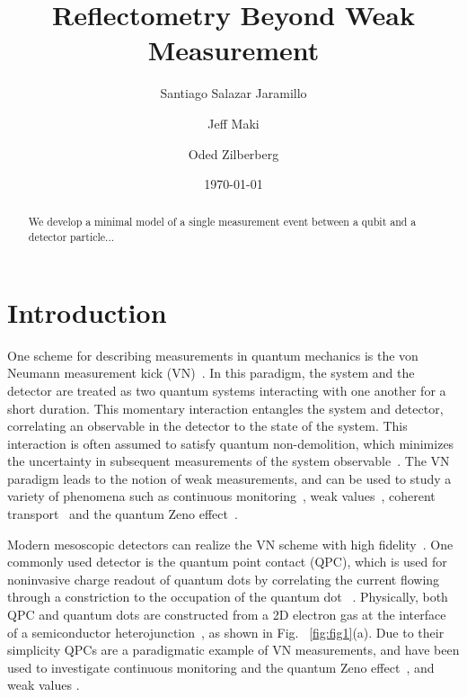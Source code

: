 \documentclass[10pt,
 amsmath,amssymb,
 aps,prb, twocolumn
]{revtex4-2}
\begin{document}
\title{Reflectometry Beyond Weak Measurement}

\author{Santiago Salazar Jaramillo}

\author{Jeff Maki}

\author{Oded Zilberberg}


\date{\today}

\begin{abstract}
    We develop a minimal model of a single measurement event between a qubit and a detector particle...
\end{abstract}

\maketitle

\section{Introduction}\label{sect:intro}

One scheme for describing measurements in quantum mechanics is the von Neumann measurement kick (VN)~\cite{vonNeumann1932}. In this paradigm, the system and the detector are treated as two quantum systems interacting with one another for a short duration. This momentary interaction entangles the system and detector, correlating an observable in the detector to the state of the system. This interaction is often assumed to satisfy quantum non-demolition, which minimizes the uncertainty in subsequent measurements of the system observable~\cite{braginskyNondemolition1996}. The VN paradigm leads to the notion of weak measurements, and can be used to study a variety of phenomena such as continuous monitoring~\cite{wisemanQuantumTrajectorie1996,
bauerRepeatedNonDemolition2013}, weak values~\cite{aharonov1988, alonso2005}, coherent transport~\cite{zilberbergCotunneling2014, KehreinCTAP2011,zilberbergCTAP2019} and the quantum Zeno effect~\cite{doggenzeno2023}.
 
Modern mesoscopic detectors can realize the VN scheme with high
fidelity~\cite{field1993, pilgramEfficiencyMesoscopic2002,
boissonneaultDispersiveNondemo2009}. One commonly used detector is the quantum point contact (QPC), which is used for noninvasive charge readout of quantum dots by correlating the current flowing through a constriction to the occupation of the quantum dot ~\cite{reillyFastSinglechargeSensing2007, peterssonOneElectron2010, vandersypenDetectionElectron2004}. Physically, both QPC and quantum dots are constructed from a 2D electron gas at the interface of a semiconductor heterojunction~\cite{vanhouten1996}, as shown in Fig.~
\ref{fig:fig1}(a). Due to their simplicity QPCs are a paradigmatic example of VN measurements, and have been used to investigate continuous monitoring and the quantum Zeno effect~\cite{gurvitz1996, gurvitzQuantumDescriptionClassical2003,
korotkovMeasurementDoubleDot1999}, and weak values \cite{zilberbergSensingAmplification2011, romito2012}.
\end{document}
